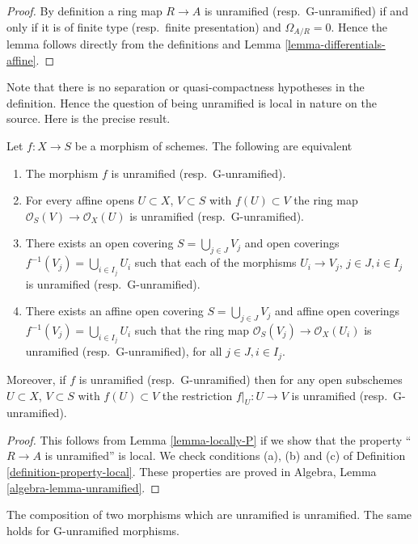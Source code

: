 \begin{proof}
By definition a ring map $R \to A$ is unramified (resp.\ G-unramified)
if and only if it is of finite type (resp.\ finite presentation)
and $\Omega_{A/R} = 0$. Hence the lemma follows
directly from the definitions and Lemma \ref{lemma-differentials-affine}.
\end{proof}

\medskip\noindent
Note that there is no separation or quasi-compactness hypotheses in the
definition. Hence the question of being unramified is local in nature on
the source. Here is the precise result.

\begin{lemma}
\label{lemma-unramified-characterize}
Let $f : X \to S$ be a morphism of schemes.
The following are equivalent
\begin{enumerate}
\item The morphism $f$ is unramified (resp.\ G-unramified).
\item For every affine opens $U \subset X$, $V \subset S$
with $f(U) \subset V$ the ring map
$\mathcal{O}_S(V) \to \mathcal{O}_X(U)$ is unramified (resp.\ G-unramified).
\item There exists an open covering $S = \bigcup_{j \in J} V_j$
and open coverings $f^{-1}(V_j) = \bigcup_{i \in I_j} U_i$ such
that each of the morphisms $U_i \to V_j$, $j\in J, i\in I_j$
is unramified (resp.\ G-unramified).
\item There exists an affine open covering $S = \bigcup_{j \in J} V_j$
and affine open coverings $f^{-1}(V_j) = \bigcup_{i \in I_j} U_i$ such
that the ring map $\mathcal{O}_S(V_j) \to \mathcal{O}_X(U_i)$ is
unramified (resp.\ G-unramified), for all $j\in J, i\in I_j$.
\end{enumerate}
Moreover, if $f$ is unramified (resp.\ G-unramified) then for
any open subschemes $U \subset X$, $V \subset S$ with $f(U) \subset V$
the restriction $f|_U : U \to V$ is unramified (resp.\ G-unramified).
\end{lemma}

\begin{proof}
This follows from Lemma \ref{lemma-locally-P} if we show that
the property ``$R \to A$ is unramified'' is local.
We check conditions (a), (b) and (c) of Definition
\ref{definition-property-local}.
These properties are proved in
Algebra, Lemma \ref{algebra-lemma-unramified}.
\end{proof}

\begin{lemma}
\label{lemma-composition-unramified}
The composition of two morphisms which are unramified is unramified.
The same holds for G-unramified morphisms.
\end{lemma}

